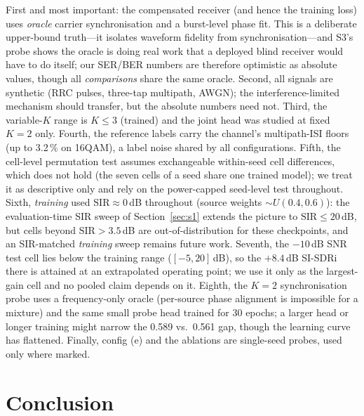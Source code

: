 \documentclass[review,12pt]{elsarticle}
\newcommand{\sir}{\mathrm{SIR}}
\begin{document}
First and most important: the compensated receiver (and hence the
training loss) uses \emph{oracle} carrier synchronisation and a
burst-level phase fit. This is a deliberate upper-bound truth---it
isolates waveform fidelity from synchronisation---and S3's probe shows
the oracle is doing real work that a deployed blind receiver would have
to do itself; our SER/BER numbers are therefore optimistic as absolute
values, though all \emph{comparisons} share the same oracle. Second,
all signals are synthetic (RRC pulses, three-tap multipath, AWGN); the
interference-limited mechanism should transfer, but the absolute numbers
need not. Third, the variable-$K$ range is $K \leq 3$ (trained) and the
joint head was studied at fixed $K{=}2$ only. Fourth, the reference
labels carry the channel's multipath-ISI floors (up to 3.2\,\% on
16QAM), a label noise shared by all configurations. Fifth, the
cell-level permutation test assumes exchangeable within-seed cell
differences, which does not hold (the seven cells of a seed share one
trained model); we treat it as descriptive only and rely on the
power-capped seed-level test throughout. Sixth, \emph{training} used $\sir \approx 0$\,dB throughout (source
weights $\sim U(0.4, 0.6)$): the evaluation-time SIR sweep of
Section~\ref{sec:s1} extends the picture to $\sir \leq 20$\,dB, but
cells beyond $\sir > 3.5$\,dB are out-of-distribution for these
checkpoints, and an SIR-matched \emph{training} sweep remains future
work. Seventh, the $-10$\,dB SNR test cell lies below the training
range ($[-5, 20]$\,dB), so the $+8.4$\,dB SI-SDRi there is attained at
an extrapolated operating point; we use it only as the largest-gain
cell and no pooled claim depends on it. Eighth, the $K{=}2$
synchronisation probe uses a frequency-only
oracle (per-source phase alignment is impossible for a mixture) and
the same small probe head trained for 30 epochs; a larger head or
longer training might narrow the 0.589 vs.\ 0.561 gap, though the
learning curve has flattened. Finally, config (e) and the ablations
are single-seed probes, used only where marked.

\section{Conclusion}
\label{sec:concl}
\end{document}
